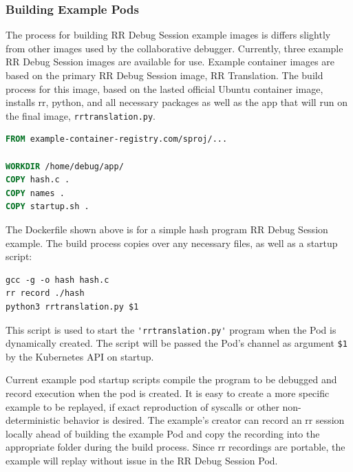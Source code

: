 \documentclass[12pt]{article}
\begin{document}
\subsubsection{Building Example Pods} \label{buildingchannel}

The process for building RR Debug Session example images is differs
slightly from other images used by the collaborative debugger.
Currently, three example RR Debug Session images are available for
use.  Example container images are based on the primary RR Debug
Session image, RR Translation.  The build process for this image,
based on the lasted official Ubuntu container image, installs rr,
python, and all necessary packages as well as the app that will run on
the final image, \lstinline{rrtranslation.py}.

\begin{lstlisting}[language=Dockerfile,basicstyle=\linespread{0.5}\ttfamily,caption={RR Debug Session Hash Example---Dockerfile},captionpos=b]
FROM example-container-registry.com/sproj/...
  
WORKDIR /home/debug/app/
COPY hash.c .
COPY names .
COPY startup.sh .
\end{lstlisting}

The Dockerfile shown above is for a simple hash program RR Debug
Session example.  The build process copies over any necessary files,
as well as a startup script:

\begin{lstlisting}[basicstyle=\linespread{0.5}\ttfamily,caption={Example Startup Script},captionpos=b]
gcc -g -o hash hash.c
rr record ./hash
python3 rrtranslation.py $1
\end{lstlisting}

This script is used to start the \lstinline{'rrtranslation.py'} program
when the Pod is dynamically created.  The script will be passed the
Pod's channel as argument \lstinline{$1} by the Kubernetes API on
startup.
\par

Current example pod startup scripts compile the program to be debugged
and record execution when the pod is created.  It is easy to create a
more specific example to be replayed, if exact reproduction of
syscalls or other non-deterministic behavior is desired.  The
example's creator can record an rr session locally ahead of building
the example Pod and copy the recording into the appropriate folder
during the build process.  Since rr recordings are portable, the
example will replay without issue in the RR Debug Session Pod.
\end{document}
